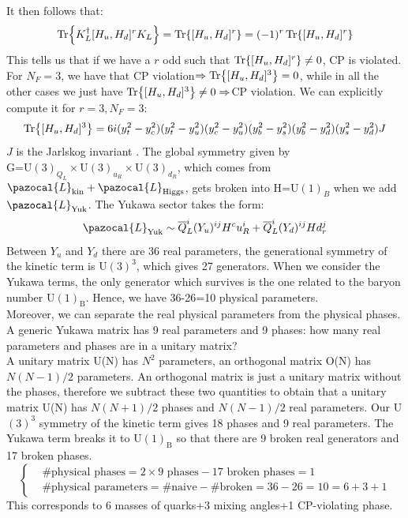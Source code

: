 \documentclass[../main.tex]{subfiles}
\begin{document}
It then follows that: 
\[
\Tr{K_L^\dagger[H_u,H_d]^rK_L}=\Tr{[H_u,H_d]^r}=(-1)^r\Tr{[H_u,H_d]^r}
\]
This tells us that if we have a $r$ odd such that $\Tr{[H_u,H_d]^r}\neq0$, CP is violated. For $N_F=3$, we have that CP violation$\Rightarrow\Tr{[H_u,H_d]^3}=0$, while in all the other cases we just have $\Tr{[H_u,H_d]^3}\neq0\Rightarrow$CP violation. We can explicitly compute it for $r=3, N_F=3$:
\[
\Tr{[H_u,H_d]^3}=6i(y_t^2-y_c^2)(y_t^2-y_u^2)(y_c^2-y_u^2)(y_b^2-y_s^2)(y_b^2-y_d^2)(y_s^2-y_d^2)J
\]
$J$ is the Jarlskog invariant
. The global symmetry given by\\
G=U$(3)_{Q_L}\times$U$(3)_{u_R}\times$U$(3)_{d_R}$, which comes from $\pazocal{L}_{\text{kin}}+\pazocal{L}_{\text{Higgs}}$, gets broken into H=U$(1)_B$ when we add $\pazocal{L}_{\text{Yuk}}$. The Yukawa sector takes the form:
\[
\pazocal{L}_{\text{Yuk}}\sim\overline{Q}_L^i(Y_u)^{ij}H^cu_R^i+\overline{Q}_L^i(Y_d)^{ij}Hd_r^j
\]
Between $Y_u$ and $Y_d$ there are 36 real parameters, the generational symmetry of the kinetic term is U$(3)^3$, which gives 27 generators. When we consider the Yukawa terms, the only generator which survives is the one related to the baryon number U$(1)_{\text{B}}$. Hence, we have 36-26=10 physical parameters.\\ 
Moreover, we can separate the real physical parameters from the physical phases. A generic Yukawa matrix has 9 real parameters and 9 phases: how many real parameters and phases are in a unitary matrix?\\
A unitary matrix U(N) has $N^2$ parameters, an orthogonal matrix O(N) has $N(N-1)/2$ parameters. An orthogonal matrix is just a unitary matrix without the phases, therefore we subtract these two quantities to obtain that a unitary matrix U(N) has $N(N+1)/2$ phases and $N(N-1)/2$ real parameters. Our U$(3)^3$ symmetry of the kinetic term gives 18 phases and 9 real parameters. The Yukawa term breaks it to U$(1)_{\text{B}}$ so that there are 9 broken real generators and 17 broken phases.
\[
\left\{
\begin{aligned}
&\text{\# physical phases}=2\times9\text{ phases}-17\text{ broken phases}=1\\
&\text{\# physical parameters}=\#\text{naive}-\#\text{broken}=36-26=10=6+3+1
\end{aligned}
\right.
\]
This corresponds to 6 masses of quarks+3 mixing angles+1 CP-violating phase.
\end{document}
